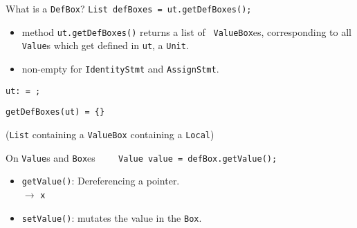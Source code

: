 \begin{slide}{What is a {\tt DefBox}?}
\vspace*{-0.1in}
{\tt List defBoxes = ut.getDefBoxes();}

\vspace*{-0.05in}
\begin{itemize}
\item method {\red \tt ut.getDefBoxes()} returns a list of {\tt
ValueBox}es, corresponding to all {\tt Value}s which get defined
in {\tt ut}, a {\tt Unit}. 

\item non-empty for {\tt IdentityStmt} and {\tt AssignStmt}.
\end{itemize}

\vspace*{-0.08in}
\begin{center}
{\tt ut: {\red {}} = {\blue {}};}
\end{center}

\vspace*{0.05in}
{\tt getDefBoxes(ut) = \{{\red {}}\}}\\
\qquad \qquad \begin{minipage}{0.7\textwidth} 
({\tt List} containing a {\tt ValueBox} containing a {\tt Local})
\end{minipage}

\end{slide}

\begin{slide}{On {\tt Value}s and {\tt Box}es}
{\red \verb+    Value value = defBox.getValue();+}

\begin{itemize}
\item {\tt getValue()}: Dereferencing a pointer.\\
\qquad \qquad \qquad \qquad {} $\to$ {\tt x}
\item {\tt setValue()}: mutates the value in the {\tt Box}.
\end{itemize}

\end{slide}

